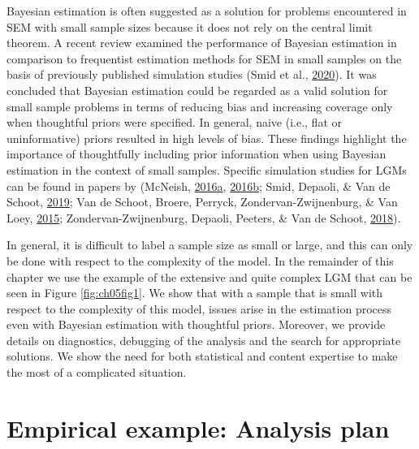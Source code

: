 \documentclass[openright,titlepage,12pt,a4paper]{book}
\begin{document}
Bayesian estimation is often suggested as a solution for problems encountered in SEM with small sample sizes because it does not rely on the central limit theorem. A recent review examined the performance of Bayesian estimation in comparison to frequentist estimation methods for SEM in small samples on the basis of previously published simulation studies (Smid et al., \protect\hyperlink{ref-smid_bayesian_2019}{2020}). It was concluded that Bayesian estimation could be regarded as a valid solution for small sample problems in terms of reducing bias and increasing coverage only when thoughtful priors were specified. In general, naive (i.e., flat or uninformative) priors resulted in high levels of bias. These findings highlight the importance of thoughtfully including prior information when using Bayesian estimation in the context of small samples. Specific simulation studies for LGMs can be found in papers by (McNeish, \protect\hyperlink{ref-mcneish_using_2016}{2016}\protect\hyperlink{ref-mcneish_using_2016}{a}, \protect\hyperlink{ref-mcneish_using_2016-1}{2016}\protect\hyperlink{ref-mcneish_using_2016-1}{b}; Smid, Depaoli, \& Van de Schoot, \protect\hyperlink{ref-smid_predicting_2019}{2019}; Van de Schoot, Broere, Perryck, Zondervan-Zwijnenburg, \& Van Loey, \protect\hyperlink{ref-van_de_schoot_analyzing_2015}{2015}; Zondervan-Zwijnenburg, Depaoli, Peeters, \& Van de Schoot, \protect\hyperlink{ref-zondervan-zwijnenburg_pushing_2018}{2018}).

In general, it is difficult to label a sample size as small or large, and this can only be done with respect to the complexity of the model. In the remainder of this chapter we use the example of the extensive and quite complex LGM that can be seen in Figure \ref{fig:ch05fig1}. We show that with a sample that is small with respect to the complexity of this model, issues arise in the estimation process even with Bayesian estimation with thoughtful priors. Moreover, we provide details on diagnostics, debugging of the analysis and the search for appropriate solutions. We show the need for both statistical and content expertise to make the most of a complicated situation.

\newpage

\hypertarget{empirical-example-analysis-plan}{%
\section{Empirical example: Analysis plan}\label{empirical-example-analysis-plan}}
\end{document}
